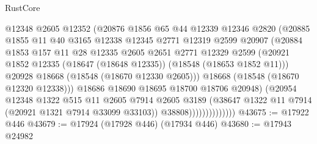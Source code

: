 \begin{lexlean}{RustCore}
\begin{coremodule}
                              @12348
                              @2605
                              @12352
                              (@20876
                                @1856
                                @65
                                @44
                                @12339
                                @12346
                                @2820
                                (@20885
                                  @1855
                                  @11
                                  @40
                                  @3165
                                  @12338
                                  @12345
                                  @2771
                                  @12319
                                  @2599
                                  @20907
                                  (@20884
                                    @1853
                                    @157
                                    @11
                                    @28
                                    @12335
                                    @2605
                                    @2651
                                    @2771
                                    @12329
                                    @2599
                                    (@20921
                                      @1852
                                      @12335
                                      (@18647 (@18648 @12335))
                                      (@18548 (@18653 @1852 @11)))
                                    @20928
                                    @18668
                                    (@18548 (@18670 @12330 @2605)))
                                  @18668
                                  (@18548 (@18670 @12320 @12338)))
                                @18686
                                @18690
                                @18695
                                @18700
                                @18706
                                @20948)
                              (@20954
                                @12348
                                @1322
                                @515
                                @11
                                @2605
                                @7914
                                @2605
                                @3189
                                (@38647 @1322 @11 @7914 (@20921 @1321 @7914 @33099 @33103))
                                @38808))))))))))))))
@43675 := @17922 @446
@43679 := @17924 (@17928 @446) (@17934 @446)
@43680 := @17943 @24982

\end{coremodule}
\end{lexlean}
